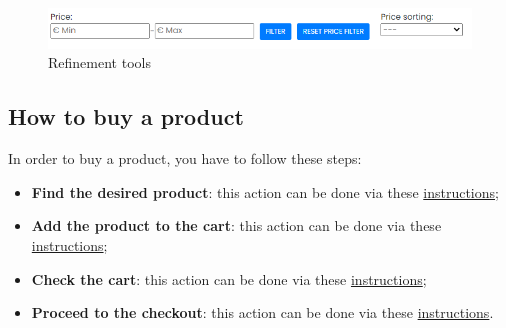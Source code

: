 \begin{figure}[H]
    \centering
    \includegraphics[width=35
    em]{res/images/cliente/refinementtools.png}
    \caption{Refinement tools}
\end{figure}

\subsection{How to buy a product} \label{_buyproduct}
In order to buy a product, you have to follow these steps:
\begin{itemize} 
    \item \textbf{Find the desired product}: this action can be done via these \hyperref[_lookforproduct]{instructions};
    \item \textbf{Add the product to the cart}: this action can be done via these \hyperref[_addproduct]{instructions};
    \item \textbf{Check the cart}: this action can be done via these \hyperref[_checkcart]{instructions};
    \item \textbf{Proceed to the checkout}: this action can be done via these \hyperref[_checkout]{instructions}.  
\end{itemize}

